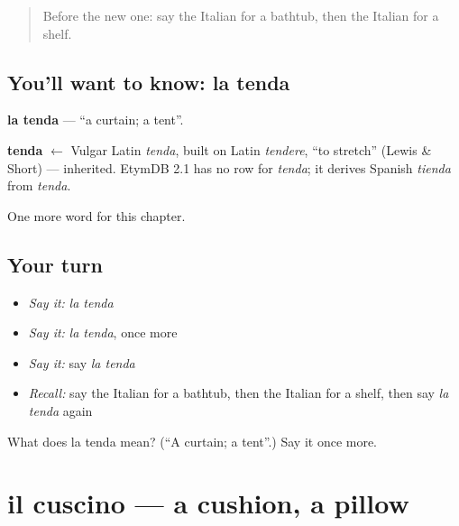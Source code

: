 \label{lesson:IT-C95-tenda}



\begin{quote}
Before the new one: say the Italian for a bathtub, then the Italian for a shelf.
\end{quote}

\subsection*{You'll want to know: la tenda}
\textbf{la tenda} — \textquotedblleft{}a curtain; a tent\textquotedblright{}.

\begin{cousinweb}
\textbf{tenda} $\leftarrow$ Vulgar Latin \emph{tenda}, built on Latin \emph{tendere}, \textquotedblleft{}to stretch\textquotedblright{} (Lewis \& Short) — inherited. EtymDB 2.1 has no row for \emph{tenda}; it derives Spanish \emph{tienda} from \emph{tenda}.
\end{cousinweb}

\begin{grammarlens}[title={What you've built}]
One more word for this chapter.
\end{grammarlens}

\subsection*{Your turn}
\begin{itemize}
\raggedright
  \item \emph{Say it:} \emph{la tenda}
  \item \emph{Say it:} \emph{la tenda}, once more
  \item \emph{Say it:} say \emph{la tenda}
  \item \emph{Recall:} say the Italian for a bathtub, then the Italian for a shelf, then say \emph{la tenda} again
\end{itemize}

\begin{tcolorbox}[breakable,colback=teal!4,colframe=teal!35!black,title={Before you move on}]
What does la tenda mean? (\textquotedblleft{}A curtain; a tent\textquotedblright{}.) Say it once more.
\end{tcolorbox}
\section[il cuscino]{il cuscino — a cushion, a pillow}

\label{lesson:IT-C95-cuscino}



